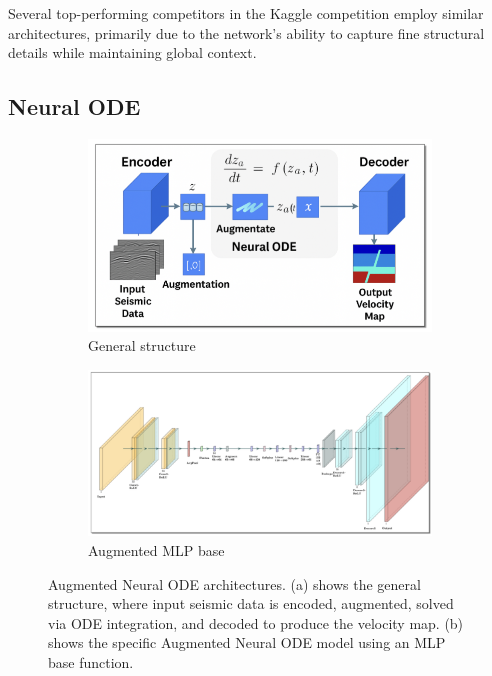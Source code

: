 \documentclass{article}
\begin{document}
Several top-performing competitors in the Kaggle competition employ similar architectures, primarily due to the network's ability to capture fine structural details while maintaining global context.

\subsection{Neural ODE}
\begin{figure}
    \centering
    \begin{subfigure}[b]{0.47\linewidth}
        \centering
        \includegraphics[width=\linewidth]{figures/neuralode_structure.png}
        \caption{General structure}
    \end{subfigure}
    \hfill
    \begin{subfigure}[b]{0.47\linewidth}
        \centering
        \includegraphics[width=\linewidth]{figures/augmented_neuralode.png}
        \caption{Augmented MLP base}
    \end{subfigure}
    \caption{Augmented Neural ODE architectures. (a) shows the general structure, where input seismic data is encoded, augmented, solved via ODE integration, and decoded to produce the velocity map. (b) shows the specific Augmented Neural ODE model using an MLP base function.}
    \label{fig:neuralode-merged}
\end{figure}
\end{document}
